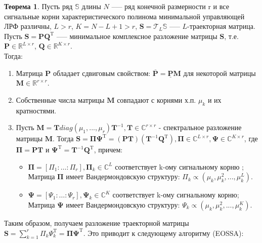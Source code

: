 \documentclass[specialist,
               substylefile = spbu_report.rtx,
               subf,href,colorlinks=true, 12pt]{disser}
\theoremstyle{definition}
\newtheorem{theorem}{Теорема}
\begin{document}
\begin{theorem}
\label{th1}
Пусть ряд $\mathbb{S}$ длины $N$ --— ряд конечной размерности r и все сигнальные корни характеристического полинома минимальной управляющей ЛРФ различны, $L > r$, $K = N - L + 1 > r$, $\mathbf{S} = \mathcal{T}_L\mathbb{S}$ --— $L$-траекторная матрица. Пусть $\mathbf{S} = \mathbf{P Q}^{\mathrm{T}}$ --— минимальное комплексное разложение матрицы $\mathbf{S}$, т.е. $\mathbf{P} \in \mathbb{R}^{L \times r}$, $\mathbf{Q} \in \mathbb{R}^{K \times r}$. \\
    \hspace*{0.5cm} Тогда:
    \begin{enumerate}
        \item Матрица $\mathbf{P}$ обладает сдвиговым свойством: $\overline{\mathbf{P}} = \underline{\mathbf{P}}\mathbf{M}$ для некоторой матрицы $\mathbf{M} \in \mathbb{R}^{r \times r}$.
        \item Собственные числа матрицы $\mathbf{M}$ совпадают с корнями х.п. $\mu_k$ и их кратностями.
        \item Пусть $\mathbf{M} = \mathbf{T}diag(\mu_1, ..., \mu_r)\mathbf{T}^{-1}, \mathbf{T} \in \mathbb{C}^{r \times r}$ - спектральное разложение матрицы $\mathbf{M}$.
        Тогда $\mathbf{S} = \mathbf{\Pi \Psi}^{\mathrm{T}} = (\mathbf{PT})(\mathbf{T}^{-1}\mathbf{ Q}^{\mathrm{T}}), \mathbf{\Pi} \in \mathbb{C}^{L \times r}, \mathbf{\Psi} \in \mathbb{C}^{K \times r}$, где $\mathbf{\Pi} = \mathbf{PT}$ и $\mathbf{\Psi}^{\mathrm{T}} = \mathbf{T}^{-1}\mathbf{Q}^{\mathrm{T}}$, причем:
        \begin{itemize}
            \item $\mathbf{\Pi} = [\Pi_1: \ldots :\Pi_r], \mathbf{\Pi}_k \in \mathbb{C}^{L}$ соответствует k-ому сигнальному корню ; Матрица $\mathbf{\Pi}$ имеет Вандермондовскую структуру: $\Pi_k \propto (\mu_k, \mu_k^2, ..., \mu_k^L)$.
            
            \item $\mathbf{\Psi} = [\Psi_1: \ldots :\Psi_r], \mathbf{\Psi}_k \in \mathbb{C}^{K}$ соответствует k-ому сигнальному корню; Матрица $\mathbf{\Psi}$ имеет Вандермондовскую структуру: $\Psi_k \propto (\mu_k, \mu_k^2, ..., \mu_k^K)$.
        \end{itemize}
    \end{enumerate}

\end{theorem}
Таким образом, получаем разложение траекторной матрицы $\mathbf{S} = \sum^r_{k=1} \Pi_k\Psi_k^{\mathrm{T}} = \mathbf{\Pi \Psi}^{\mathrm{T}}$. Это приводит к следующему алгоритму (EOSSA):
\end{document}
